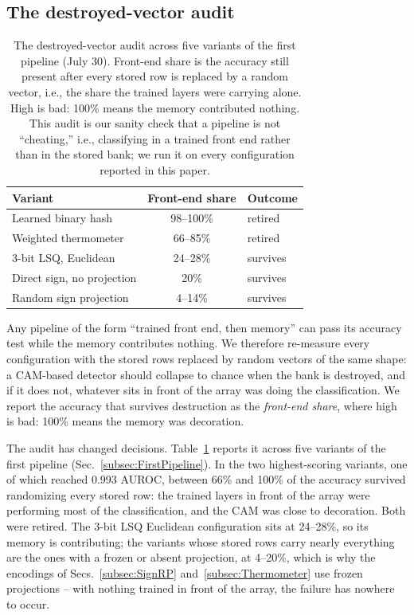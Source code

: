 \documentclass[conference]{IEEEtran}
\newcommand{\cam}{{CAM}\xspace}
\newcommand{\auroc}{{AUROC}\xspace}
\begin{document}
\subsection{The destroyed-vector audit}
\label{subsec:Audit}
\label{subsec:AuditResults}
\begin{table}[t]
\centering
\caption{The destroyed-vector audit across five variants of the first
pipeline (July 30). Front-end share is the accuracy still present after
every stored row is replaced by a random vector, i.e., the share the
trained layers were carrying alone. High is bad: 100\% means the memory
contributed nothing. This audit is our sanity check that a pipeline is
not ``cheating,'' i.e., classifying in a trained front end rather than
in the stored bank; we run it on every configuration reported in this
paper.}
\label{tab:audit}
{\footnotesize
\begin{tabular}{@{}lcl@{}}
\toprule
\textbf{Variant} & \textbf{Front-end share} & \textbf{Outcome} \\
\midrule
Learned binary hash          & 98--100\% & retired \\
Weighted thermometer         & 66--85\%  & retired \\
3-bit LSQ, Euclidean         & 24--28\%  & survives \\
Direct sign, no projection   & 20\%      & survives \\
Random sign projection       & 4--14\%   & survives \\
\bottomrule
\end{tabular}}
\end{table}
Any pipeline of the form ``trained front end, then memory'' can pass
its accuracy test while the memory contributes nothing. We therefore
re-measure every configuration with the stored rows replaced by random
vectors of the same shape: a \cam-based detector should collapse to
chance when the bank is destroyed, and if it does not, whatever sits
in front of the array was doing the classification. We report the
accuracy that survives destruction as the \emph{front-end share},
where high is bad: 100\% means the memory was decoration.

The audit has changed decisions. Table~\ref{tab:audit} reports it
across five variants of the first pipeline
(Sec.~\ref{subsec:FirstPipeline}). In the two highest-scoring
variants, one of which reached 0.993 \auroc, between 66\% and 100\%
of the accuracy survived randomizing every stored row: the trained
layers in front of the array were performing most of the
classification, and the \cam was close to decoration. Both were
retired. The 3-bit LSQ Euclidean configuration sits at 24--28\%, so
its memory is contributing; the variants whose stored rows carry
nearly everything are the ones with a frozen or absent projection, at
4--20\%, which is why the encodings of Secs.~\ref{subsec:SignRP}
and~\ref{subsec:Thermometer} use frozen projections -- with nothing
trained in front of the array, the failure has nowhere to occur.
\end{document}
